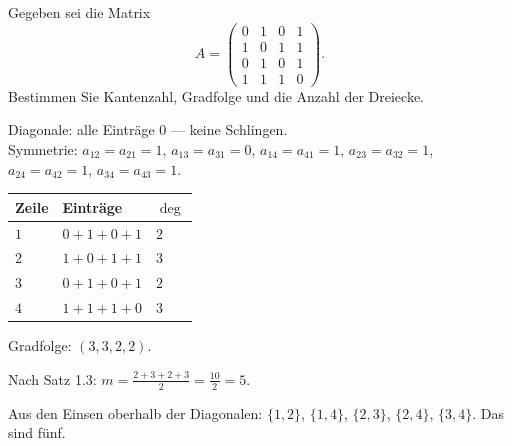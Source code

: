 \begin{aufgabe}
Gegeben sei die Matrix
\[ A = \begin{pmatrix}
0 & 1 & 0 & 1 \\
1 & 0 & 1 & 1 \\
0 & 1 & 0 & 1 \\
1 & 1 & 1 & 0
\end{pmatrix} . \]
Bestimmen Sie Kantenzahl, Gradfolge und die Anzahl der Dreiecke.

\loesung
{}
Diagonale: alle Einträge $0$ --- keine Schlingen. \checkmark\\
Symmetrie: $a_{12} = a_{21} = 1$, $a_{13} = a_{31} = 0$, $a_{14} = a_{41} = 1$, $a_{23} = a_{32} = 1$, $a_{24} = a_{42} = 1$, $a_{34} = a_{43} = 1$. \checkmark

\begin{center}
\renewcommand{\arraystretch}{1.4}
\begin{tabular}{@{}P{1.4cm}P{2.6cm}P{1.4cm}@{}}
\toprule
\textbf{Zeile} & \textbf{Einträge} & $\deg$\\
\midrule
$1$ & $0+1+0+1$ & $2$\\
$2$ & $1+0+1+1$ & $3$\\
$3$ & $0+1+0+1$ & $2$\\
$4$ & $1+1+1+0$ & $3$\\
\bottomrule
\end{tabular}
\end{center}
Gradfolge: $(3,3,2,2)$.

Nach Satz 1.3: $m = \frac{2+3+2+3}{2} = \frac{10}{2} = 5$.

Aus den Einsen oberhalb der Diagonalen: $\{1,2\}$, $\{1,4\}$, $\{2,3\}$, $\{2,4\}$, $\{3,4\}$. Das sind fünf. \checkmark

\begin{center}
\end{center}


\end{aufgabe}
